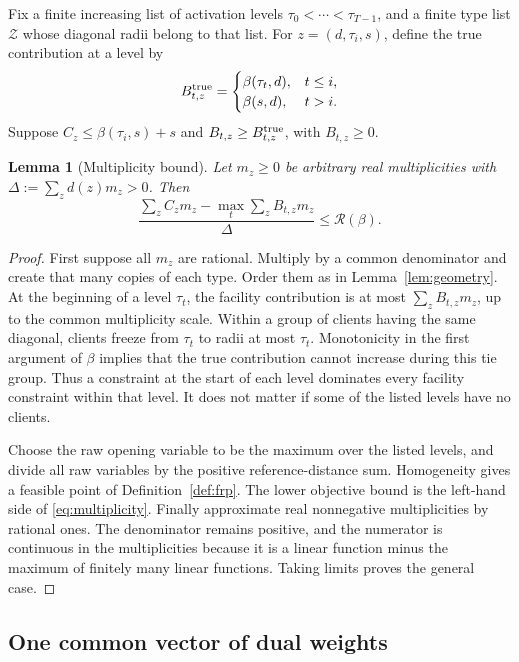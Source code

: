 \documentclass[11pt]{article}
\numberwithin{equation}{section}
\newtheorem{lemma}[theorem]{Lemma}
\theoremstyle{definition}
\newcommand{\calR}{\mathcal R}
\begin{document}
Fix a finite increasing list of activation levels
$\tau_0<\cdots<\tau_{T-1}$, and a finite type list $\mathcal Z$ whose diagonal
radii belong to that list. For $z=(d,\tau_i,s)$, define the true contribution
at a level by
\begin{equation}\label{eq:trueB}
 B^{\rm true}_{t,z}=
 \begin{cases}
  \beta(\tau_t,d),&t\le i,\\
  \beta(s,d),&t>i.
 \end{cases}
\end{equation}
Suppose $C_z\le\beta(\tau_i,s)+s$ and
$B_{t,z}\ge B^{\rm true}_{t,z}$, with $B_{t,z}\ge0$.

\begin{lemma}[Multiplicity bound]\label{lem:multiplicity}
Let $m_z\ge0$ be arbitrary real multiplicities with
$\Delta:=\sum_zd(z)m_z>0$. Then
\begin{equation}\label{eq:multiplicity}
 \frac{\sum_z C_zm_z-\max_t\sum_zB_{t,z}m_z}{\Delta}
 \le\calR(\beta).
\end{equation}
\end{lemma}
\begin{proof}
First suppose all $m_z$ are rational. Multiply by a common denominator and
create that many copies of each type. Order them as in
Lemma~\ref{lem:geometry}. At the beginning of a level $\tau_t$, the
facility contribution is at most $\sum_zB_{t,z}m_z$, up to the common
multiplicity scale. Within a group of clients having the same diagonal,
clients freeze from $\tau_t$ to radii at most $\tau_t$. Monotonicity in the
first argument of $\beta$ implies that the true contribution cannot
increase during this tie group. Thus a constraint at the start of each
level dominates every facility constraint within that level. It does not
matter if some of the listed levels have no clients.

Choose the raw opening variable to be the maximum over the listed levels,
and divide all raw variables by the positive reference-distance sum.
Homogeneity gives a feasible point of Definition~\ref{def:frp}. The lower
objective bound is the left-hand side of \eqref{eq:multiplicity}.
Finally approximate real nonnegative multiplicities by rational ones.
The denominator remains positive, and the numerator is continuous in the
multiplicities because it is a linear function minus the maximum of finitely
many linear functions. Taking limits proves the general case.
\end{proof}

\subsection{One common vector of dual weights}
\end{document}
